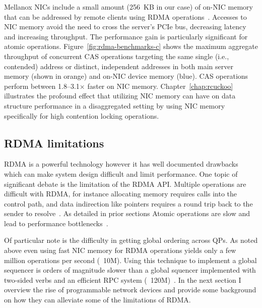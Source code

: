 \documentclass[12pt]{ucsddissertation}
\begin{document}
Mellanox NICs include a small amount (256~KB in our case) of on-NIC memory that can be addressed by
remote clients using RDMA operations~\cite{device-memory}.  Accesses to NIC memory avoid the need to
cross the server's PCIe bus, decreasing latency and increasing throughput.  The performance gain is
particularly significant for atomic operations.  Figure~\ref{fig:rdma-benchmarks-c} shows the
maximum aggregate throughput of concurrent CAS operations targeting the same single (i.e.,
contended) address or distinct, independent addresses in both main server memory (shown in orange)
and on-NIC device memory (blue).  CAS operations perform between 1.8--3.1$\times$ faster on NIC
memory.  
Chapter~\ref{chap:rcuckoo} illustrates the profound effect that utilizing NIC memory can have on
data structure performance in a disaggregated setting by using NIC memory specifically for high
contention locking operations.

\subsection{RDMA limitations}

RDMA is a powerful technology however it has well documented drawbacks which can make system design
difficult and limit performance. One topic of significant debate is the limitation of the RDMA API.
Multiple operations are difficult with RDMA, for instance allocating memory requires calls into the
control path, and data indirection like pointers requires a round trip back to the sender to
resolve~\cite{prism}. As detailed in prior sections Atomic operations are slow and lead to
performance bottlenecks~\cite{design-guidelines}.

Of particular note is the difficulty in getting global ordering across QPs. As noted above even
using fast NIC memory for RDMA operations yields only a few million operations per second (~10M).
Using this technique to implement a global sequencer is orders of magnitude slower than a global
squencer implemented with two-sided verbs and an efficient RPC system
(~120M)~\cite{design-guidelines}. In the next section I overview the rise of programmable network
devices and provide some background on how they can alleviate some of the limitations of RDMA.


\end{document}
